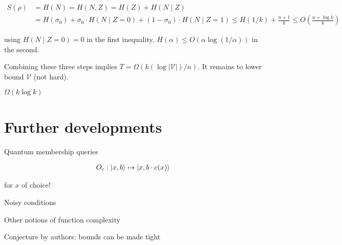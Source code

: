 \documentclass[12]{amsart}
\newcommand\0{\mathbf{0}}
\newcommand\<{\langle}
\renewcommand\>{\rangle}
\begin{document}
\begin{align*}
S (\rho) &= H (N) = H (N, Z) = H (Z) + H (N \mid Z)\\
&= H(\sigma_0)+\sigma_0\cdot H(N \mid Z=0)+(1- \sigma_0)\cdot H(N\mid Z=1)\leq H (1/k) + \frac{n+1}{k} \leq O(\frac{n + \log k}{k}) 
\end{align*}

using $H(N \mid Z = 0) = 0$ in the first inequality, $H(\alpha) \leq O(\alpha \log(1/\alpha))$ in the second.

Combining these three steps implies $T = \Omega(k(\log|\mathcal{V}|)/n)$. It remains to lower bound $\mathcal{V}$ (not hard).

$\Omega( k \log k)$

\section{Further developments}

Quantum membership queries

\begin{align*}
O_c : \ket{x,b} \mapsto \ket{x, b \cdot c(x)}	
\end{align*}

for $x$ of choice!

Noisy conditions

Other notions of function complexity

Conjecture by authors: bounds can be made tight
\end{document}
